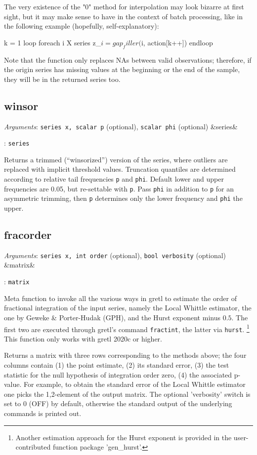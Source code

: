 \documentclass[11pt,english]{article}
\newcommand{\ArgRet}[2]{%
  {\it Arguments}: {#1}%
  \ifx&#2&%
  \else
  \par\smallskip\noindent {\it Return type}: \texttt{#2}
  \fi%
  \par\medskip\par%
  }
\begin{document}
The very existence of the "0" method for interpolation may look
bizarre at first sight, but it may make sense to have in the context
of batch processing, like in the following example (hopefully,
self-explanatory):
\begin{code}
k = 1
loop foreach i X
   series z_$i = gap_filler($i, action[k++])
endloop
\end{code}

Note that the function only replaces NAs between valid observations;
therefore, if the origin series has missing values at the beginning or
the end of the sample, they will be in the returned series too.

\subsection{winsor}

\ArgRet{\texttt{series x, scalar p} (optional), \texttt{scalar
phi} (optional)}{series}

Returns a trimmed (``winsorized'') version
of the series, where outliers are replaced with implicit threshold
values. Truncation quantiles are determined according to relative
tail frequencies \texttt{p} and \texttt{phi}. Default lower and upper
frequencies are 0.05, but re-settable with \texttt{p}. Pass \texttt{phi}
in addition to \texttt{p} for an asymmetric trimming, then \texttt{p}
determines only the lower frequency and \texttt{phi} the upper.

\subsection{fracorder}

\ArgRet{\texttt{series x, int order} (optional), \texttt{bool verbosity} (optional)}{matrix}

Meta function to invoke all the various ways in gretl to estimate the order of fractional
integration of the input series, namely the Local Whittle estimator, the one by
Geweke \& Porter-Hudak (GPH), and the Hurst exponent minus $0.5$. The first two
are executed through gretl's command \texttt{fractint}, the latter via \texttt{hurst}.%
\footnote{Another estimation approach for the Hurst exponent is provided in the
user-contributed function package 'gen\_hurst'.}
This function only works with gretl 2020c or higher.

Returns a matrix with three rows corresponding to the methods above; the four columns
contain (1) the point estimate, (2) its standard error, (3) the test statistic for the null
hypothesis of integration order zero, (4) the associated p-value. For example, to obtain
the standard error of the Local Whittle estimator one picks the 1,2-element of the output
matrix. The optional 'verbosity' switch is set to 0 (OFF) by default, otherwise the standard
output of the underlying commands is printed out.
\end{document}
